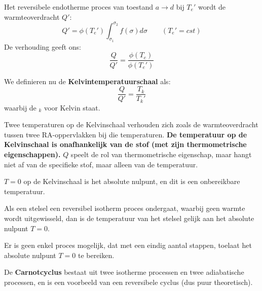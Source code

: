 Het reversibele endotherme proces van toestand \(a \to d \) bij \(T_e'\) wordt de warmteoverdracht \(Q'\):
\[
Q' = \phi(T_e') \int_{\sigma_1}^{\sigma_2}f(\sigma)d\sigma  \qquad (T_e' = cst)
\]
De verhouding geeft ons:
\[\frac{Q}{Q'} = \frac{\phi(T_e)}{\phi(T_e')}\]

We definieren nu de \textbf{Kelvintemperatuurschaal} als:
\begin{equation}
    \label{eq:Kelvintemp}
    \frac{Q}{Q'} = \frac{T_k}{T_k'}
\end{equation}
waarbij de \(_k\) voor Kelvin staat.

Twee temperaturen op de Kelvinschaal verhouden zich zoals de warmteoverdracht tussen twee RA-oppervlakken bij die temperaturen.
\textbf{De temperatuur op de Kelvinschaal is onafhankelijk van de stof (met zijn thermometrische eigenschappen).} 
\(Q\) speelt de rol van thermometrische eigenschap, maar hangt niet af van de specifieke stof, maar alleen van de temperatuur.

\(T=0\) op de Kelvinschaal is het absolute nulpunt, en dit is een onbereikbare temperatuur.
\begin{postulate}
    Als een stelsel een reversibel isotherm proces ondergaat, waarbij geen warmte wordt uitgewisseld, dan is de temperatuur van het stelsel gelijk aan het absolute nulpunt \(T=0\).
\end{postulate}

\begin{postulate}
    Er is geen enkel proces mogelijk, dat met een eindig aantal stappen, toelaat het absolute nulpunt \(T=0\) te bereiken.
\end{postulate}

De \textbf{Carnotcyclus} bestaat uit twee isotherme processen en twee adiabatische processen, en is een voorbeeld van een reversibele cyclus (dus puur theoretisch).

